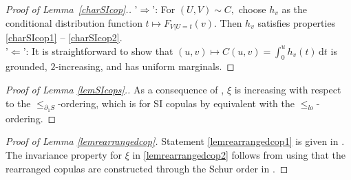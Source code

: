 \documentclass{article}
\theoremstyle{plain}
\theoremstyle{definition}
\newcommand{\de}{\mathrm{\,d}}
\begin{document}
\begin{proof}[Proof of Lemma~\ref{charSIcop}.]
    '\(\Longrightarrow\)': For \((U,V)\sim C,\) choose \(h_v\) as the conditional distribution function \(t\mapsto F_{V|U=t}(v).\) Then \(h_v\) satisfies properties \ref{charSIcop1} -- \ref{charSIcop2}.\\
    '\(\Longleftarrow\)': It is straightforward to show that \((u,v)\mapsto C(u,v) = \int_0^u h_v(t) \de t\) is grounded, \(2\)-increasing, and has uniform marginals. 
\end{proof}

\begin{proof}[Proof of Lemma \ref{lemSIcops}.]
As a consequence of \cite[Lemmas 2.4 and 2.10]{Ansari-Rockel-2023}, \(\xi\) is increasing with respect to the \(\leq_{\partial_1 S}\)-ordering, which is for SI copulas by \cite[Lemmas 2.6 (ii)]{Ansari-Rockel-2023} equivalent with the \(\leq_{lo}\)-ordering. 
\end{proof}

\begin{proof}[Proof of Lemma \ref{lemrearrangedcop}]
    Statement \ref{lemrearrangedcop1} is given in \cite[Proposition 3.17]{Ansari-Rueschendorf-2021}.
    The invariance property for \(\xi\) in \ref{lemrearrangedcop2} follows from \cite[Lemma 2.10]{Ansari-Rockel-2023} using that the rearranged copulas are constructed through the Schur order in \cite[Definition 2.3]{Ansari-Rockel-2023}.
\end{proof}
\end{document}
